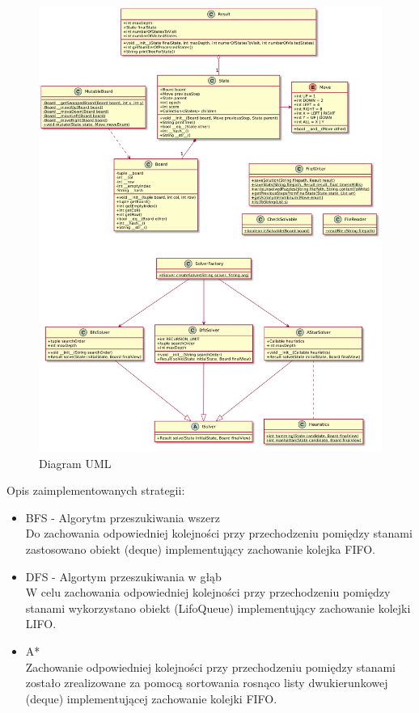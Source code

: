 \documentclass{classrep}
\begin{document}
{\begin{figure}[ht!]
	\begin{center}
		\includegraphics[scale=0.5]{uml}
		\caption{Diagram UML}
	\end{center}
\end{figure}
\newpage

Opis zaimplementowanych strategii:
  \begin{itemize}
  \item BFS - Algorytm przeszukiwania wszerz \\Do zachowania odpowiedniej kolejności przy przechodzeniu pomiędzy stanami zastosowano obiekt (deque) implementujący zachowanie kolejka FIFO.
  \item DFS - Algortym przeszukiwania w głąb \\W celu zachowania odpowiedniej kolejności przy przechodzeniu pomiędzy stanami wykorzystano obiekt (LifoQueue) implementujący zachowanie kolejki LIFO.\\
  \item A* \\Zachowanie odpowiedniej kolejności przy przechodzeniu pomiędzy stanami zostało zrealizowane za pomocą sortowania rosnąco listy dwukierunkowej (deque) implementującej zachowanie kolejki FIFO.
  \end{itemize}
}
\end{document}
